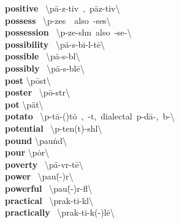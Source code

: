 \documentclass[10pt,a4paper]{article}
\begin{document}
\begin{multicols}{2}
\textbf{ positive }\quad \ \textbackslash \textprimstress p\"{a}-z\textschwa -tiv\ ,\ \textprimstress p\"{a}z-tiv\textbackslash \\
\textbf{ possess }\quad \ \textbackslash p\textschwa -\textprimstress zes\ \ also\ -\textprimstress ses\textbackslash \\
\textbf{ possession }\quad \ \textbackslash p\textschwa -\textprimstress ze-sh\textschwa n\ also\ -\textprimstress se-\textbackslash \\
\textbf{ possibility }\quad \ \textbackslash \textsecstress p\"{a}-s\textschwa -\textprimstress bi-l\textschwa -t\={e}\textbackslash \\
\textbf{ possible }\quad \ \textbackslash \textprimstress p\"{a}-s\textschwa -b\textschwa l\textbackslash \\
\textbf{ possibly }\quad \ \textbackslash \textprimstress p\"{a}-s\textschwa -bl\={e}\textbackslash \\
\textbf{ post }\quad \textbackslash \textprimstress p\={o}st\textbackslash \\
\textbf{ poster }\quad \ \textbackslash \textprimstress p\={o}-st\textschwa r\textbackslash \\
\textbf{ pot }\quad \textbackslash \textprimstress p\"{a}t\textbackslash \\
\textbf{ potato }\quad \ \textbackslash p\textschwa -\textprimstress t\={a}-(\textsecstress )t\={o}\ ,\ -t\textschwa ,\ dialectal\ p\textschwa -\textprimstress d\={a}-,\ b\textschwa -\textbackslash \\
\textbf{ potential }\quad \ \textbackslash p\textschwa -\textprimstress ten(t)-sh\textschwa l\textbackslash \\
\textbf{ pound }\quad \textbackslash \textprimstress pau\. nd\textbackslash \\
\textbf{ pour }\quad \textbackslash \textprimstress p\.{o}r\textbackslash \\
\textbf{ poverty }\quad \ \textbackslash \textprimstress p\"{a}-v\textschwa r-t\={e}\textbackslash \\
\textbf{ power }\quad \ \textbackslash \textprimstress pau\. (-\textschwa )r\textbackslash \\
\textbf{ powerful }\quad \ \textbackslash \textprimstress pau\. (-\textschwa )r-f\textschwa l\textbackslash \\
\textbf{ practical }\quad \ \textbackslash \textprimstress prak-ti-k\textschwa l\textbackslash \\
\textbf{ practically }\quad \ \textbackslash \textprimstress prak-ti-k(\textschwa -)l\={e}\textbackslash \\

\end{multicols}
\end{document}
